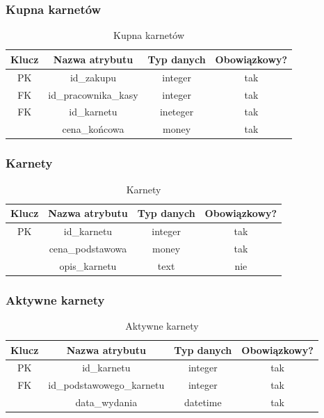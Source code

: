 \documentclass{sprawozdanie-agh}
\begin{document}
\subsubsection{Kupna karnetów}
\begin{table}[H]
	\centering
	\begin{tabular}{|c|c|c|c|}
		\hline
		Klucz & Nazwa atrybutu       & Typ danych & Obowiązkowy? \\ \hline
		PK    & id\_zakupu           & integer    & tak           \\ \hline
		FK    & id\_pracownika\_kasy & integer    & tak           \\ \hline
		FK    & id\_karnetu          & ineteger   & tak           \\ \hline
		      & cena\_końcowa       & money      & tak           \\ \hline
	\end{tabular}
	\caption{Kupna karnetów}
\end{table}

\subsubsection{Karnety}
\begin{table}[H]
	\centering
	\begin{tabular}{|c|c|c|c|}
		\hline
		Klucz & Nazwa atrybutu   & Typ danych & Obowiązkowy? \\ \hline
		PK    & id\_karnetu      & integer    & tak           \\ \hline
		      & cena\_podstawowa & money      & tak           \\ \hline
		      & opis\_karnetu    & text       & nie           \\ \hline
	\end{tabular}
	\caption{Karnety}
\end{table}

\subsubsection{Aktywne karnety}
\begin{table}[H]
	\centering
	\begin{tabular}{|c|c|c|c|}
		\hline
		Klucz & Nazwa atrybutu            & Typ danych & Obowiązkowy? \\ \hline
		PK    & id\_karnetu               & integer    & tak           \\ \hline
		FK    & id\_podstawowego\_karnetu & integer    & tak           \\ \hline
		      & data\_wydania             & datetime   & tak           \\ \hline
	\end{tabular}
	\caption{Aktywne karnety}
\end{table}
\end{document}
